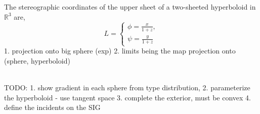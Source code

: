 \documentclass[10pt]{article}
\theoremstyle{definition}
\begin{document}
The stereographic coordinates of the upper sheet of a two-sheeted hyperboloid
in $\mathbb{R}^3$ are,
$$
    L = 
    \begin{cases}
    \phi = \frac{x}{1+z},\\
    \psi = \frac{y}{1+z}
    \end{cases}
$$
1. projection onto big sphere (exp)
2. limits being the map projection onto (sphere, hyperboloid)


{\\ 
}
TODO: 
1. show gradient in each sphere from type distribution,
2. parameterize the hyperboloid
- use tangent space
3. complete the exterior, must be convex
4. define the incidents on the SIG
\end{document}
